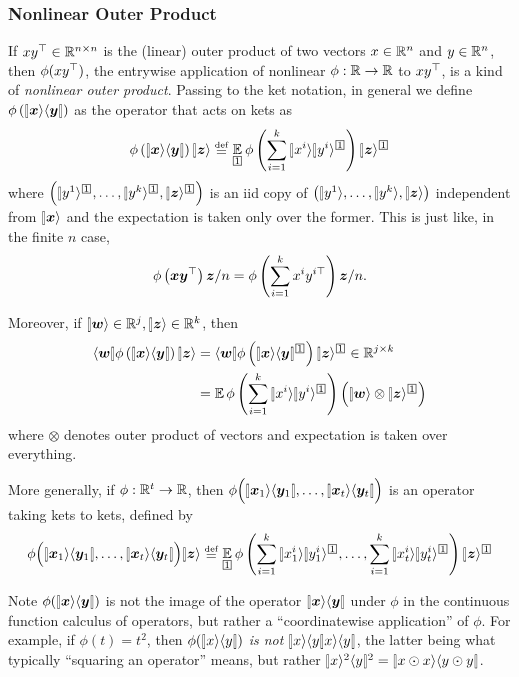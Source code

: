 \documentclass{article}
\theoremstyle{plain}
\theoremstyle{definition}
\begin{document}
\subsubsection{Nonlinear Outer Product}

If $x y^\top \in \mathbb{R}^{n\times n}$ is the (linear) outer product of two vectors $x \in \mathbb{R}^n$ and $y \in \mathbb{R}^n$, then $\phi(xy^\top)$, the entrywise application of nonlinear $\phi: \mathbb{R} \to \mathbb{R}$ to $xy^\top$, is a kind of \emph{nonlinear outer product}.%
Passing to the ket notation, in general we define $\phi\left(\ket{\xx}\bra{\yy}\right)$
as the operator that acts on kets as
\[
\phi\left(\ket{\xx}\bra{\yy}\right)\ket{\zz}\defeq\EV_{\bx{1}}\phi\left(\sum_{i=1}^{k}\ket{x^{i}}\ket{y^{i}}^{\bx{1}}\right)\ket{\zz}^{\bx{1}}
\]
where $\left(\ket{y^{1}}^{\bx{1}},\ldots,\ket{y^{k}}^{\bx{1}},\ket{\zz}^{\bx{1}}\right)$
is an iid copy of $\left(\ket{y^{1}},\ldots,\ket{y^{k}},\ket{\zz}\right)$
independent from $\ket{\xx}$ and the expectation is taken only over
the former. 
This is just like, in the finite $n$ case,
\[
\phi\left(\boldsymbol{x} \boldsymbol{y}^\top \right)\boldsymbol{z}/n = \phi\left(\sum_{i=1}^{k} x^{i}{y^{i\top}}\right) {\boldsymbol{z}}/n.
\]

Moreover, if $\ket{\ww}\in\R^{j},\ket{\zz}\in\R^{k}$,
then
\begin{align*}
\bra{\ww}\phi\left(\ket{\xx}\bra{\yy}\right)\ket{\zz} & =\bra{\ww}\phi\left(\ket{\xx}\bra{\yy}^{\bx{1}}\right)\ket{\zz}^{\bx{1}}\in\R^{j\times k}\\
 & =\EV\phi\left(\sum_{i=1}^{k}\ket{x^{i}}\ket{y^{i}}^{\bx{1}}\right)\left(\ket{\ww}\otimes\ket{\zz}^{\bx{1}}\right)
\end{align*}
where $\otimes$ denotes outer product of vectors and expectation
is taken over everything.

More generally, if $\phi: \mathbb{R}^t \to \mathbb{R}$, then $\phi\Big(\ket{\xx_1}\bra{\yy_1}, \ldots, \ket{\xx_t}\bra{\yy_t}\Big)$ is an operator taking kets to kets, defined by
\begin{align*}
  \phi\Big(\ket{\xx_1}\bra{\yy_1}, \ldots, \ket{\xx_t}\bra{\yy_t}\Big) \ket \zz \defeq
  \EV_{\bx{1}}\phi\left(\sum_{i=1}^{k}\ket{x_1^{i}}\ket{y_1^{i}}^{\bx{1}}, \ldots, \sum_{i=1}^{k}\ket{x_t^{i}}\ket{y_t^{i}}^{\bx{1}}\right)\ket{\zz}^{\bx{1}}
\end{align*}

\begin{rem}
Note $\phi(\ket \xx \bra \yy)$ is not the image of the operator $\ket \xx \bra \yy$ under $\phi$ in the continuous function calculus of operators, but rather a ``coordinatewise application'' of $\phi$.
For example, if $\phi(t) =t^2$, then $\phi(\ket x \bra y)$ \emph{is not} $\ket x \bra y x\ra \bra y$, the latter being what typically ``squaring an operator'' means, but rather $\ket{x}^2 \bra{y}^2 = \ket{x\odot x}\bra{y\odot y}$.
\end{rem}
\end{document}
